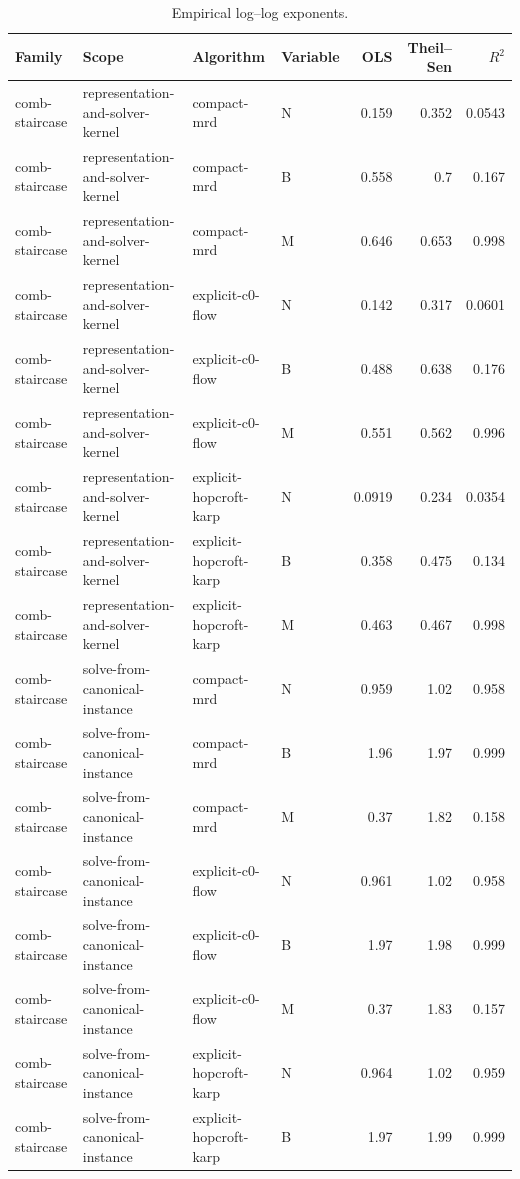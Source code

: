\begin{table}[t]
\caption{Empirical log--log exponents.}
\label{tab:kernel-exponents}
\begin{tabular}{llllrrr}
\toprule
Family & Scope & Algorithm & Variable & OLS & Theil--Sen & $R^2$ \\
\midrule
comb-staircase & representation-and-solver-kernel & compact-mrd & N & 0.159 & 0.352 & 0.0543 \\
comb-staircase & representation-and-solver-kernel & compact-mrd & B & 0.558 & 0.7 & 0.167 \\
comb-staircase & representation-and-solver-kernel & compact-mrd & M & 0.646 & 0.653 & 0.998 \\
comb-staircase & representation-and-solver-kernel & explicit-c0-flow & N & 0.142 & 0.317 & 0.0601 \\
comb-staircase & representation-and-solver-kernel & explicit-c0-flow & B & 0.488 & 0.638 & 0.176 \\
comb-staircase & representation-and-solver-kernel & explicit-c0-flow & M & 0.551 & 0.562 & 0.996 \\
comb-staircase & representation-and-solver-kernel & explicit-hopcroft-karp & N & 0.0919 & 0.234 & 0.0354 \\
comb-staircase & representation-and-solver-kernel & explicit-hopcroft-karp & B & 0.358 & 0.475 & 0.134 \\
comb-staircase & representation-and-solver-kernel & explicit-hopcroft-karp & M & 0.463 & 0.467 & 0.998 \\
comb-staircase & solve-from-canonical-instance & compact-mrd & N & 0.959 & 1.02 & 0.958 \\
comb-staircase & solve-from-canonical-instance & compact-mrd & B & 1.96 & 1.97 & 0.999 \\
comb-staircase & solve-from-canonical-instance & compact-mrd & M & 0.37 & 1.82 & 0.158 \\
comb-staircase & solve-from-canonical-instance & explicit-c0-flow & N & 0.961 & 1.02 & 0.958 \\
comb-staircase & solve-from-canonical-instance & explicit-c0-flow & B & 1.97 & 1.98 & 0.999 \\
comb-staircase & solve-from-canonical-instance & explicit-c0-flow & M & 0.37 & 1.83 & 0.157 \\
comb-staircase & solve-from-canonical-instance & explicit-hopcroft-karp & N & 0.964 & 1.02 & 0.959 \\
comb-staircase & solve-from-canonical-instance & explicit-hopcroft-karp & B & 1.97 & 1.99 & 0.999 \\

\end{tabular}
\end{table}
